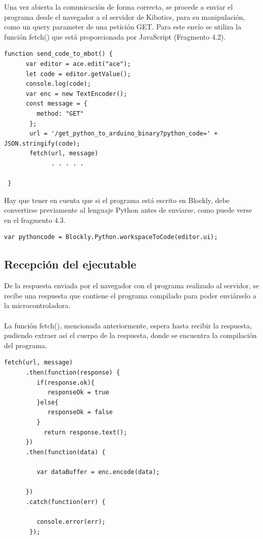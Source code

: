 \documentclass{report}
\begin{document}
Una vez abierta la comunicación de forma correcta, se procede a enviar el programa desde el navegador a el servidor de Kibotics, para su manipulación, como un query parameter de una petición GET. Para este envío se utiliza la función fetch() que está proporcionada por JavaScript (Fragmento 4.2).
\\
\begin{lstlisting}[frame=single,breaklines=true, label=Envio del programa desde el navegador al servidor, caption=Envio del programa desde el navegador al servidor, captionpos=b]
   function send_code_to_mbot() {
      var editor = ace.edit("ace");
      let code = editor.getValue();
      console.log(code);
      var enc = new TextEncoder();
      const message = {
         method: "GET"
       };
       url = '/get_python_to_arduino_binary?python_code=' + JSON.stringify(code);
       fetch(url, message)
             . . . . .
  
 }
\end{lstlisting}
Hay que tener en cuenta que si el programa está escrito en Blockly, debe convertirse previamente al lenguaje Python antes de enviarse, como puede verse en el fragmento 4.3.
\\
\begin{lstlisting}[frame=single,breaklines=true, label=Conversión de Blockly a Python, caption=Conversión de Blockly a Python, captionpos=b]
   var pythoncode = Blockly.Python.workspaceToCode(editor.ui);
\end{lstlisting}

\subsection{Recepción del ejecutable}

De la respuesta enviada por el navegador con el programa realizado al servidor, se recibe una respuesta que contiene el programa compilado para poder enviárselo a la microcontroladora.
\\
\\
La función fetch(), mencionada anteriormente, espera hasta recibir la respuesta, pudiendo extraer así el cuerpo de la respuesta, donde se encuentra la compilación del programa.
\\
\begin{lstlisting}[frame=single,breaklines=true, label=Extracción del dato enviado en la respuesta, caption=Extracción del dato enviado en la respuesta, captionpos=b]
   fetch(url, message)
      .then(function(response) {
         if(response.ok){
            responseOk = true
         }else{
            responseOk = false
         }
           return response.text();
      })
      .then(function(data) {
        
         var dataBuffer = enc.encode(data);
           
      })
      .catch(function(err) {

         console.error(err);
       });

\end{lstlisting}
\end{document}
